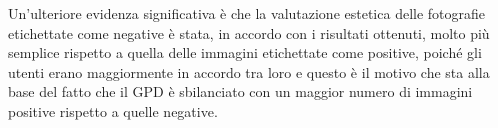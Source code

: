 Un'ulteriore evidenza significativa è che la valutazione estetica delle fotografie etichettate come negative è stata, in accordo con i risultati ottenuti, molto più semplice rispetto a quella delle immagini etichettate come positive, poiché gli utenti erano maggiormente in accordo tra loro e questo è il motivo che sta alla base del fatto che il GPD è sbilanciato con un maggior numero di immagini positive rispetto a quelle negative.





